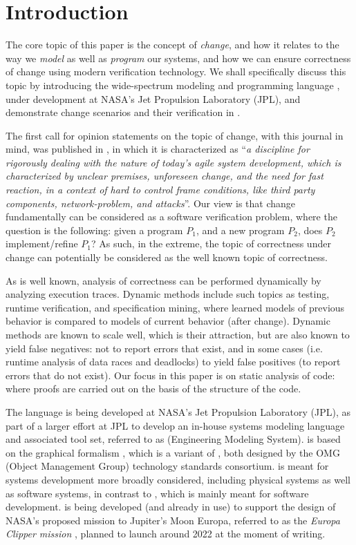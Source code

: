 
\section{Introduction}

The core topic of this paper is the concept of {\em change}, and how
it relates to the way we {\em model} as well as {\em program} our
systems, and how we can ensure correctness of change using modern
verification technology.  We shall specifically discuss this topic by
introducing the wide-spectrum modeling and programming language
\Klang, under development at NASA's Jet Propulsion Laboratory (JPL),
and demonstrate change scenarios and their verification in \Klang.

The first call for opinion statements on the topic of change, with
this journal in mind, was published in \cite{steffen-isola-2014}, in
which it is characterized as ``{\em a discipline for rigorously
  dealing with the nature of today's agile system development, which
  is characterized by unclear premises, unforeseen change, and the
  need for fast reaction, in a context of hard to control frame
  conditions, like third party components, network-problem, and
  attacks}''.
%
Our view is that change fundamentally can be considered as a software
verification problem, where the question is the following: given a
program $P_1$, and a new program $P_2$, does $P_2$ implement/refine
$P_1$?  As such, in the extreme, the topic of correctness under change
can potentially be considered as the well known topic of correctness.

As is well known, analysis of correctness can be performed dynamically
by analyzing execution traces. Dynamic methods include such topics as
testing, runtime verification, and specification mining, where learned
models of previous behavior is compared to models of current behavior
(after change). Dynamic methods are known to scale well, which is
their attraction, but are also known to yield false negatives: not to
report errors that exist, and in some cases (i.e. runtime analysis of
data races and deadlocks) to yield false positives (to report errors
that do not exist). Our focus in this paper is on static analysis of
code: where proofs are carried out on the basis of the structure of
the code.

The \Klang{} language is being developed at NASA's Jet Propulsion
Laboratory (JPL), as part of a larger effort at JPL to develop an
in-house systems modeling language and associated tool set, referred
to as \ems{} (Engineering Modeling System). \ems{} is based on the
graphical \sysml{} formalism \cite{sysml}, which is a variant of
\uml{} \cite{uml}, both designed by the OMG (Object Management Group)
technology standards consortium. \sysml{} is meant for systems
development more broadly considered, including physical systems as
well as software systems, in contrast to \uml{}, which is mainly meant
for software development.  \ems{} is being developed (and already in
use) to support the design of NASA's proposed mission to Jupiter's
Moon Europa, referred to as the {\em Europa Clipper mission}
\cite{europa-clipper}, planned to launch around 2022 at the moment of
writing.

